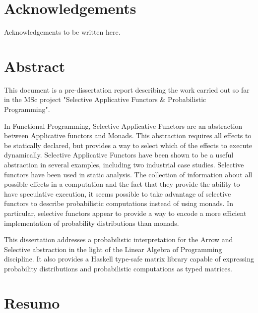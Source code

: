 \documentclass[
  oneside,
  11pt, a4paper,
  footinclude=true,
  headinclude=true,
  cleardoublepage=empty
]{scrbook}
\author{Armando João Isaías Ferreira dos Santos}
\date{\myear} %
\theoremstyle{definition}
\theoremstyle{definition}
\begin{document}
	\umfrontcover	
	\umtitlepage
	
	\chapter*{Acknowledgements}
	Acknowledgements to be written here. %


	\chapter*{Abstract}

    This document is a pre-dissertation report describing the work carried out so far in the MSc project "Selective Applicative Functors \& Probabilistic Programming". %
    
    In Functional Programming, Selective Applicative Functors are an abstraction between Applicative functors and Monads. This abstraction requires all effects to be statically declared, but provides a way to select which of the effects to execute dynamically. Selective Applicative Functors have been shown to be a useful abstraction in several examples, including two industrial case studies. Selective functors have been used in static analysis. The collection of information about all possible effects in a computation and the fact that they provide the ability to have speculative execution, it seems possible to take advantage of selective functors to describe probabilistic computations instead of using monads. In particular, selective functors appear to provide a way to encode a more efficient implementation of probability distributions than monads.
    
    This dissertation addresses a probabilistic interpretation for the Arrow and Selective abstraction in the light of the Linear Algebra of Programming discipline. It also provides a Haskell type-safe matrix library capable of expressing probability distributions and probabilistic computations as typed matrices.
	
	\vskip0.5cm
	
	\cleardoublepage
	\chapter*{Resumo}
	
\end{document}
